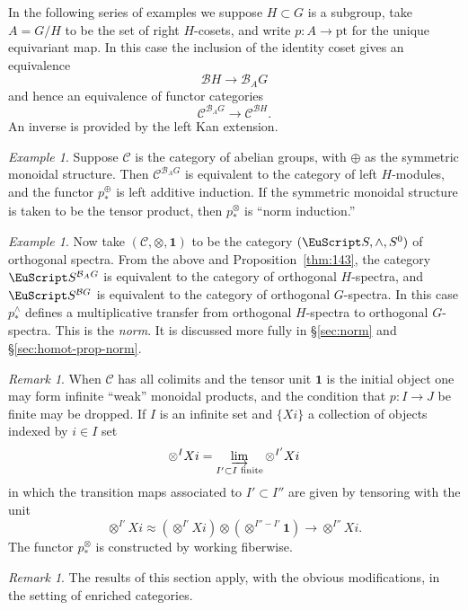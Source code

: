 \documentclass{amsart}
\newtheorem{rem}[equation]{Remark}
\theoremstyle{definition}
\theoremstyle{remark}
\newtheorem{rem}[equation]{Remark}
\newtheorem{eg}[equation]{Example}
\newcommand{\spectra}{\EuScript S}
\newcommand{\cat}[1]{{\mathcal #1}}
\newcommand{\one}{\mathbf{1}}
\newcommand{\tensorp}[1]{#1^{\otimes}_{\ast}}
\begin{document}
In the following series of examples we suppose $H\subset G$ is a
subgroup, take $A=G/H$ to be the set of right $H$-cosets, and write
$p:A\to\text{pt}$ for the unique equivariant map.   In this case the
inclusion of the identity coset gives an equivalence 
\[
\cat{B} H\to \cat{B}_{A}G
\]
and hence an equivalence of functor categories
\[
\cat C^{\cat{B}_{A}G} \to \cat{C}^{\cat{B}H}.
\]
An inverse is provided by the left Kan extension.

\begin{eg}
\label{eg:10} 
Suppose $\cat C$ is the category of abelian groups, with
$\oplus$ as the symmetric monoidal structure.  Then
$\cat{C}^{\cat{B}_{A}G}$ is equivalent to the category of left
$H$-modules, and the functor $p^{\oplus}_{\ast}$ is left additive
induction.  If the symmetric monoidal structure is taken to be the
tensor product, then $\tensorp{p}$ is ``norm induction.''
\end{eg}

\begin{eg}
Now take $(\cat C,\otimes,\one)$ to be the category $(\spectra,\wedge,
S^{0})$ of orthogonal spectra.  From the above and
Proposition~\ref{thm:143}, the category $\spectra^{\cat{B}_{A}G}$ is
equivalent to the category of orthogonal $H$-spectra, and
$\spectra^{\cat{B}G}$ is equivalent to the category of orthogonal
$G$-spectra.  In this case $p^{\wedge}_{\ast}$ defines a
multiplicative transfer from orthogonal $H$-spectra to orthogonal
$G$-spectra.  This is the {\em norm}.  It is discussed more fully in
\S\ref{sec:norm} and \S\ref{sec:homot-prop-norm}.
\end{eg}

\begin{rem}
\label{rem:1} When $\cat C$ has all colimits and the tensor unit
$\one$ is the initial object one may form infinite ``weak'' monoidal
products, and the condition that $p:I\to J$ be finite may be dropped.
If $I$ is an infinite set and $\{Xi \}$ a collection of objects
indexed by $i\in I$ set
\[
\otimes^{I} Xi = \varinjlim_{I'\subset I\text{ finite}} \otimes^{I'}Xi
\]
in which the transition maps associated to $I'\subset I''$ are given
by tensoring with the unit
\[
\otimes^{I'}Xi \approx
\left(\otimes^{I'}Xi\right)\otimes\left(\otimes^{I''-
I'}\one\right) \to \otimes^{I''}Xi.
\]
The functor $\tensorp{p}$ is constructed by working fiberwise.
\end{rem}

\begin{rem}
The results of this section apply, with the obvious modifications, in
the setting of enriched categories.
\end{rem}
\end{document}
